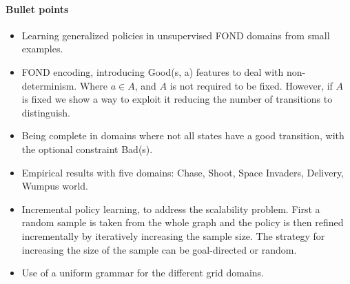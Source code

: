 \documentclass[a4paper]{article}
\begin{document}
\newpage

\paragraph{Bullet points}
\begin{itemize}
\item Learning generalized policies in unsupervised FOND domains from small examples.
\item FOND encoding, introducing Good(s, a) features to deal with non-determinism. Where $a \in A$, and $A$ is not required to be fixed. However, if $A$ is fixed we show a way to exploit it reducing the number of transitions to distinguish.
\item Being complete in domains where not all states have a good transition, with the optional constraint Bad(s).
\item Empirical results with five domains: Chase, Shoot, Space Invaders, Delivery, Wumpus world.
\item Incremental policy learning, to address the scalability problem. First a random sample is taken from the whole graph and the policy is then refined incrementally by iteratively increasing the sample size. The strategy for increasing the size of the sample can be goal-directed or random.
\item Use of a uniform grammar for the different grid domains.
\end{itemize}




\end{document}
